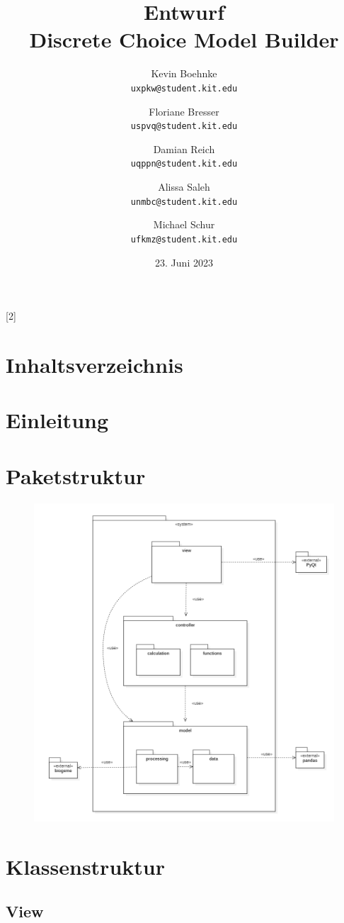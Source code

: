 \documentclass{article}
\title{Entwurf \\ \large Discrete Choice Model Builder}
\author{Kevin Boehnke \\ \texttt{uxpkw@student.kit.edu}
\and Floriane Bresser \\ \texttt{uspvq@student.kit.edu}
\and Damian Reich \\ \texttt{uqppn@student.kit.edu}
\and Alissa Saleh \\ \texttt{unmbc@student.kit.edu}
\and Michael Schur \\ \texttt{ufkmz@student.kit.edu}}
\date{23. Juni 2023}
\begin{document}
\maketitle
\newpage
\startcontents[maintableofcontents]
[2]{\section*{Inhaltsverzeichnis}}
\thispagestyle{empty}
\newpage
{}

\section{Einleitung}
\section{Paketstruktur}
\begin{figure}[H]%
    \centering
    \line
    \includegraphics[width = 13cm]{img/PackageDiagram.png}
\end{figure}

\section{Klassenstruktur}
\subsection{View}
\end{document}
